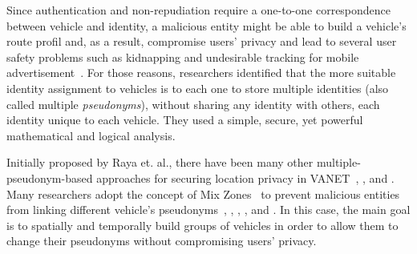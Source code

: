 \documentclass[preprint,12pt]{elsarticle}
\begin{document}
Since authentication and non-repudiation require a one-to-one correspondence between vehicle and identity, a malicious entity might be able to build a vehicle's route profil and, as a result, compromise users' privacy and lead to several user safety problems such as kidnapping and undesirable tracking for mobile advertisement~\cite{mix-zone-vanets}. For those reasons, researchers \cite{haas2010impact} identified that the more suitable identity assignment to vehicles is to each one to store multiple identities (also called multiple \textit{pseudonyms}), without sharing any identity with others, each identity unique to each vehicle. They used a simple, secure, yet powerful mathematical and logical analysis.



Initially proposed by Raya et. al.\cite{keys-distro1}, there have been many other multiple-pseudonym-based approaches for securing location privacy in VANET~\cite{keys-distro2-thesis}, \cite{keys-distro8}, \cite{calandriello2007efficient} and  \cite{sun2010efficient}. Many researchers adopt the concept of Mix Zones~\cite{mix-zone} to prevent malicious entities from linking different vehicle's pseudonyms~\cite{lu2012pseudonym}, \cite{mix-zone-vanets}, \cite{buttyan2007effectiveness}, \cite{caravan}, \cite{buttyan2009slow} and \cite{mix-zone-motion}. In this case, the main goal is to spatially and temporally build groups of vehicles in order to allow them to change their pseudonyms without compromising users' privacy.
\end{document}
